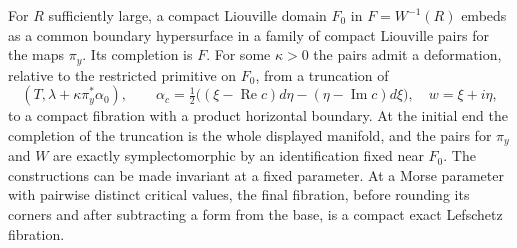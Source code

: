 \begin{proposition}\label{prop:compactpair}
For $R$ sufficiently large, a compact Liouville domain $F_0$ in $F=W^{-1}(R)$ embeds as a common boundary hypersurface in a family of compact Liouville pairs for the maps $\pi_y$. Its completion is $F$. For some $\kappa>0$ the pairs admit a deformation, relative to the restricted primitive on $F_0$, from a truncation of
\[
           (T,\lambda+\kappa\pi_y^*\alpha_0),\qquad
          \alpha_c=\tfrac12\big((\xi-\operatorname{Re}c)d\eta
                              -(\eta-\operatorname{Im}c)d\xi\big),
          \quad w=\xi+i\eta ,
\]
to a compact fibration with a product horizontal boundary. At the initial end the completion of the truncation is the whole displayed manifold, and the pairs for $\pi_y$ and $W$ are exactly symplectomorphic by an identification fixed near $F_0$. The constructions can be made invariant at a fixed parameter. At a Morse parameter with pairwise distinct critical values, the final fibration, before rounding its corners and after subtracting a form from the base, is a compact exact Lefschetz fibration.
\end{proposition}


